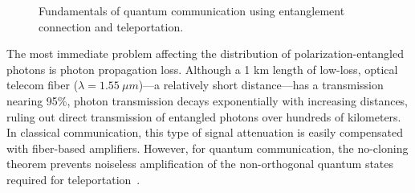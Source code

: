 \documentclass[aps,twocolumn,secnumarabic,amsmath,amssymb,pra,groupedaddress,
showpacs, showkeys]{revtex4-1}
\begin{document}
\begin{figure}[ht]
\centering
{}
\label{fig:chap1:communication}
\caption{Fundamentals of quantum communication using entanglement connection and teleportation.}
\end{figure}

The most immediate problem affecting the distribution of polarization-entangled
photons is photon propagation loss. Although a 1 km length of low-loss, optical
telecom fiber ($\lambda = 1.55~\mu m$)---a relatively short distance---has a
transmission nearing 95\%, photon transmission decays exponentially with
increasing distances, ruling out direct transmission of entangled photons over
hundreds of kilometers. In classical communication, this type of signal
attenuation is easily compensated with fiber-based amplifiers. However, for
quantum communication, the no-cloning theorem prevents noiseless amplification
of the non-orthogonal quantum states required for
teleportation~\cite{citeulike:507853}.
\end{document}
